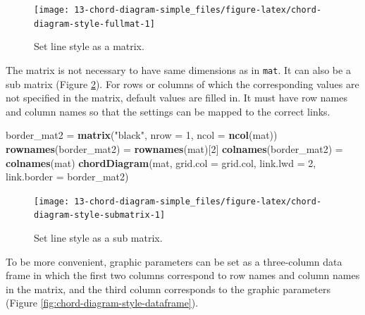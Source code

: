 \documentclass[]{book}
\newenvironment{Shaded}{\begin{snugshade}}{\end{snugshade}}
\newcommand{\KeywordTok}[1]{\textcolor[rgb]{0.13,0.29,0.53}{\textbf{#1}}}
\newcommand{\DataTypeTok}[1]{\textcolor[rgb]{0.13,0.29,0.53}{#1}}
\newcommand{\DecValTok}[1]{\textcolor[rgb]{0.00,0.00,0.81}{#1}}
\newcommand{\StringTok}[1]{\textcolor[rgb]{0.31,0.60,0.02}{#1}}
\newcommand{\NormalTok}[1]{#1}
\theoremstyle{definition}
\theoremstyle{definition}
\theoremstyle{remark}
\begin{document}
\begin{figure}

{\centering \texttt{[image: 13-chord-diagram-simple\_files/figure-latex/chord-diagram-style-fullmat-1]} 

}

\caption{Set line style as a matrix.}\label{fig:chord-diagram-style-fullmat}
\end{figure}

The matrix is not necessary to have same dimensions as in \texttt{mat}.
It can also be a sub matrix (Figure
\ref{fig:chord-diagram-style-submatrix}). For rows or columns of which
the corresponding values are not specified in the matrix, default values
are filled in. It must have row names and column names so that the
settings can be mapped to the correct links.

\begin{Shaded}
\begin{Highlighting}[]
\NormalTok{border_mat2 =}\StringTok{ }\KeywordTok{matrix}\NormalTok{(}\StringTok{"black"}\NormalTok{, }\DataTypeTok{nrow =} \DecValTok{1}\NormalTok{, }\DataTypeTok{ncol =} \KeywordTok{ncol}\NormalTok{(mat))}
\KeywordTok{rownames}\NormalTok{(border_mat2) =}\StringTok{ }\KeywordTok{rownames}\NormalTok{(mat)[}\DecValTok{2}\NormalTok{]}
\KeywordTok{colnames}\NormalTok{(border_mat2) =}\StringTok{ }\KeywordTok{colnames}\NormalTok{(mat)}
\KeywordTok{chordDiagram}\NormalTok{(mat, }\DataTypeTok{grid.col =}\NormalTok{ grid.col, }\DataTypeTok{link.lwd =} \DecValTok{2}\NormalTok{, }\DataTypeTok{link.border =}\NormalTok{ border_mat2)}
\end{Highlighting}
\end{Shaded}

\begin{figure}

{\centering \texttt{[image: 13-chord-diagram-simple\_files/figure-latex/chord-diagram-style-submatrix-1]} 

}

\caption{Set line style as a sub matrix.}\label{fig:chord-diagram-style-submatrix}
\end{figure}

To be more convenient, graphic parameters can be set as a three-column
data frame in which the first two columns correspond to row names and
column names in the matrix, and the third column corresponds to the
graphic parameters (Figure \ref{fig:chord-diagram-style-dataframe}).
\end{document}
